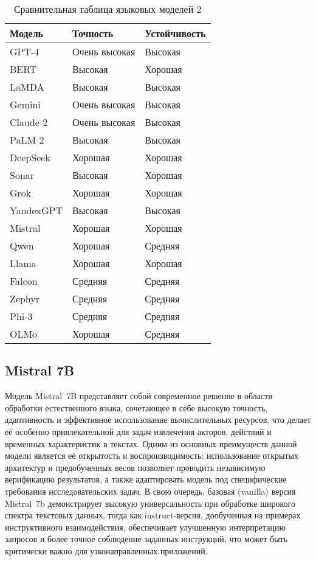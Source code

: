 \begin{table}[H]
    \centering
    \begin{tabular}{|l|l|l|}
        \hline
        Модель & Точность & Устойчивость \\
        \hline
        GPT-4  & Очень высокая      & Высокая \\
        \hline
        BERT   & Высокая            & Хорошая \\
        \hline
        LaMDA  & Высокая            & Высокая \\
        \hline
        Gemini & Очень высокая      & Высокая \\
        \hline
        Claude 2 & Очень высокая      & Высокая \\
        \hline
        PaLM 2  & Высокая   & Высокая \\
        \hline
        DeepSeek & Хорошая    & Хорошая \\
        \hline
        Sonar  & Высокая  & Хорошая \\
        \hline
        Grok  & Хорошая    & Хорошая \\
        \hline
        YandexGPT  & Высокая  & Высокая \\
        \hline
        Mistral & Хорошая    & Хорошая \\
        \hline
        Qwen  & Хорошая    & Средняя \\
        \hline
        Llama & Хорошая    & Хорошая \\
        \hline
        Falcon  & Средняя  & Средняя \\
        \hline
        Zephyr  & Средняя  & Средняя \\
        \hline
        Phi-3  & Средняя  & Средняя \\
        \hline
        OLMo   & Хорошая    & Средняя \\
        \hline
    \end{tabular}
    \caption{Сравнительная таблица языковых моделей 2}
\end{table}

\subsection{Mistral 7B}

Модель Mistral 7B представляет собой современное решение в области обработки естественного языка, сочетающее в себе высокую точность, 
адаптивность и эффективное использование вычислительных ресурсов, что делает её особенно привлекательной для задач извлечения акторов, 
действий и временных характеристик в текстах. 
Одним из основных преимуществ данной модели является её открытость и воспроизводимость: 
использование открытых архитектур и предобученных весов позволяет проводить независимую верификацию результатов, 
а также адаптировать модель под специфические требования исследовательских задач. В свою очередь, базовая (vanilla) версия Mistral 7b 
демонстрирует высокую универсальность при обработке широкого спектра текстовых данных, тогда как instruct-версия, 
дообученная на примерах инструктивного взаимодействия, обеспечивает улучшенную интерпретацию запросов и более точное соблюдение заданных инструкций, 
что может быть критически важно для узконаправленных приложений. 

